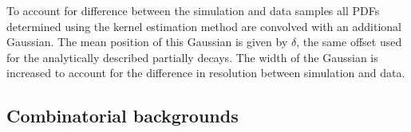 

To account for difference between the simulation and data samples all PDFs determined using the kernel estimation method are convolved with an additional Gaussian. The mean position of this Gaussian is given by $\delta$, the same offset used for the analytically described partially decays. The width of the Gaussian is increased to account for the difference in resolution between simulation and data. 


\subsection{Combinatorial  backgrounds}
\label{sec:B2DsPhi_combcomps}

